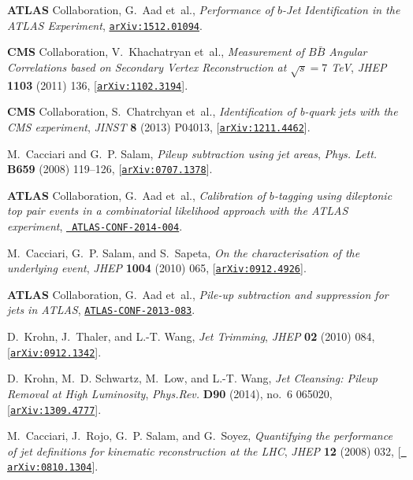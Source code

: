 \documentclass[a4paper,11pt]{article}
\begin{document}
\begin{thebibliography}{100}
{\bf ATLAS} Collaboration, G.~Aad et~al., {\it {Performance of $b$-Jet
  Identification in the ATLAS Experiment}},
  \href{http://arxiv.org/abs/1512.01094}{{\tt arXiv:1512.01094}}.

{\bf CMS} Collaboration, V.~Khachatryan et~al., {\it {Measurement of $B\bar{B}$
  Angular Correlations based on Secondary Vertex Reconstruction at $\sqrt{s}=7$
  TeV}},  {\em JHEP} {\bf 1103} (2011) 136,
  [\href{http://arxiv.org/abs/1102.3194}{{\tt arXiv:1102.3194}}].

{\bf CMS} Collaboration, S.~Chatrchyan et~al., {\it {Identification of b-quark
  jets with the CMS experiment}},  {\em JINST} {\bf 8} (2013) P04013,
  [\href{http://arxiv.org/abs/1211.4462}{{\tt arXiv:1211.4462}}].

M.~Cacciari and G.~P. Salam, {\it {Pileup subtraction using jet areas}},  {\em
  Phys. Lett.} {\bf B659} (2008) 119--126,
  [\href{http://arxiv.org/abs/0707.1378}{{\tt arXiv:0707.1378}}].

{\bf ATLAS} Collaboration, G.~Aad et~al., {\it {Calibration of $b$-tagging
  using dileptonic top pair events in a combinatorial likelihood approach with
  the ATLAS experiment}},  \href{http://arxiv.org/abs/ATLAS-CONF-2014-004}{{\tt
  ATLAS-CONF-2014-004}}.

M.~Cacciari, G.~P. Salam, and S.~Sapeta, {\it {On the characterisation of the
  underlying event}},  {\em JHEP} {\bf 1004} (2010) 065,
  [\href{http://arxiv.org/abs/0912.4926}{{\tt arXiv:0912.4926}}].

{\bf ATLAS} Collaboration, G.~Aad et~al., {\it {Pile-up subtraction and
  suppression for jets in ATLAS}},
  \href{http://arxiv.org/abs/ATLAS-CONF-2013-083}{{\tt ATLAS-CONF-2013-083}}.

D.~Krohn, J.~Thaler, and L.-T. Wang, {\it {Jet Trimming}},  {\em JHEP} {\bf 02}
  (2010) 084, [\href{http://arxiv.org/abs/0912.1342}{{\tt arXiv:0912.1342}}].

D.~Krohn, M.~D. Schwartz, M.~Low, and L.-T. Wang, {\it {Jet Cleansing: Pileup
  Removal at High Luminosity}},  {\em Phys.Rev.} {\bf D90} (2014), no.~6
  065020, [\href{http://arxiv.org/abs/1309.4777}{{\tt arXiv:1309.4777}}].

M.~Cacciari, J.~Rojo, G.~P. Salam, and G.~Soyez, {\it {Quantifying the
  performance of jet definitions for kinematic reconstruction at the LHC}},
  {\em JHEP} {\bf 12} (2008) 032, [\href{http://arxiv.org/abs/0810.1304}{{\tt
  arXiv:0810.1304}}].


\end{thebibliography}
\end{document}
